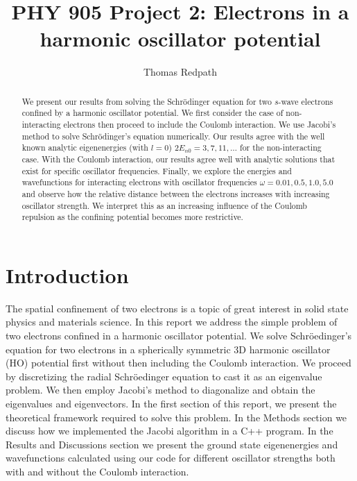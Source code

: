 \documentclass[10pt,showpacs,preprintnumbers,footinbib,amsmath,amssymb,aps,prl,twocolumn,groupedaddress,superscriptaddress,showkeys]{revtex4-1}
\begin{document}
\title{PHY 905 Project 2: Electrons in a harmonic oscillator potential}
\author{Thomas Redpath}
\begin{abstract}
We present our results from solving the Schr\"{o}dinger equation for two $s$-wave
electrons confined by a harmonic oscillator potential. We first consider the
case of non-interacting electrons then proceed to include the Coulomb
interaction. We use Jacobi's method to solve Schr\"{o}dinger's equation
numerically. Our results agree with the well known analytic eigenenergies
(with $l=0$) $2E_{n0} = 3,7,11,\dots$ for the non-interacting case. With the Coulomb
interaction, our results agree well with analytic solutions that exist for
specific oscillator frequencies. Finally, we explore the energies and wavefunctions
for interacting electrons with oscillator frequencies $\omega = 0.01,0.5,1.0,5.0$
and observe how the relative distance between the electrons increases with
increasing oscillator strength. We interpret this as an increasing influence of
the Coulomb repulsion as the confining potential becomes more restrictive.
\end{abstract}
\maketitle

\section{Introduction}

The spatial confinement of two electrons is a topic of great interest in
solid state physics and materials science. In this report we address
the simple problem of two electrons confined in a harmonic oscillator
potential. We solve Schr\"{o}edinger's equation for two electrons
in a spherically symmetric 3D harmonic oscillator (HO) potential first
without then including the Coulomb interaction. We proceed by
discretizing the radial Schr\"{o}edinger equation to cast it as an
eigenvalue problem. We then employ Jacobi's method to diagonalize
and obtain the eigenvalues and eigenvectors. In the first section of
this report, we present the theoretical framework required to solve
this problem. In the Methods section we discuss how we implemented
the Jacobi algorithm in a C++ program. In the Results and Discussions
section we present the ground state eigenenergies and wavefunctions
calculated using our code for different oscillator strengths both with and
without the Coulomb interaction.
\end{document}
